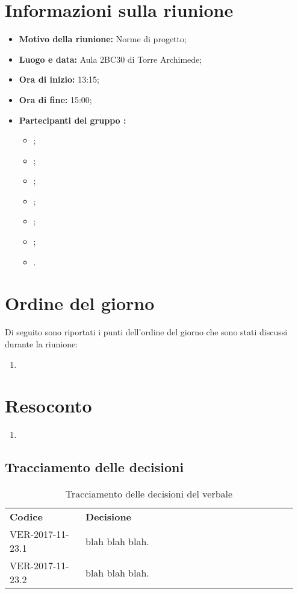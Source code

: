 \documentclass[VER-2017-11-23.tex]{subfiles}
\begin{document}
\chapter{Informazioni sulla riunione}
\begin{itemize}
	\item \textbf{Motivo della riunione:} Norme di progetto;
	\item \textbf{Luogo e data:} Aula 2BC30 di Torre Archimede;
	\item \textbf{Ora di inizio:} 13:15;
	\item \textbf{Ora di fine:} 15:00;
	\item \textbf{Partecipanti del gruppo \gruppo:}
	\begin{itemize}
		\item \Davide;
		\item \Elena;
		\item \Gianluca;
		\item \Mirco;
		\item \Parwinder;
		\item \Riccardo;
		\item \Valentina.
	\end{itemize}
\end{itemize}

\chapter{Ordine del giorno}	
Di seguito sono riportati i punti dell'ordine del giorno che sono stati discussi durante la riunione:
\begin{enumerate}
	\item 
\end{enumerate}
\chapter{Resoconto}
\begin{enumerate}
	\item 
\end{enumerate}
\section{Tracciamento delle decisioni}
\begin{table}[H]
	\begin{center}
		\begin{tabu} to 
			\tableHeaderStyle
			\textbf{Codice} & \textbf{Decisione} \\
			VER-2017-11-23.1 & blah blah blah. \\
			VER-2017-11-23.2 & blah blah blah. \\
		\end{tabu}
		\caption{Tracciamento delle decisioni del verbale}
	\end{center}
\end{table}
\end{document}

